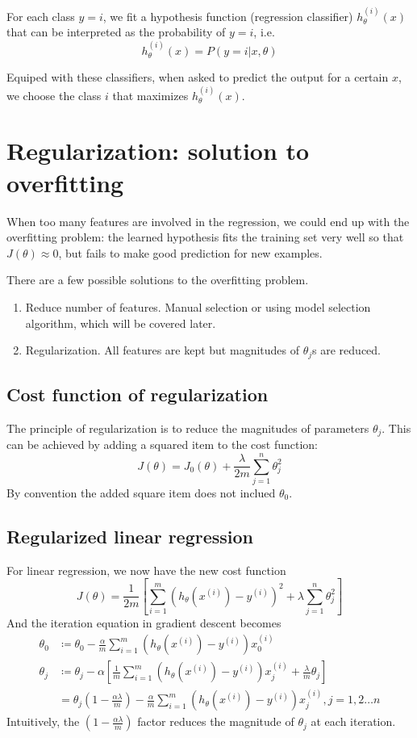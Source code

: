 For each class $y=i$, we fit a hypothesis function (regression classifier) $h_{\theta}^{(i)}(x)$ that can be interpreted as the probability of $y=i$, i.e.
$$h_{\theta}^{(i)}(x) = P(y = i|x,\theta)$$

Equiped with these classifiers, when asked to predict the output for a certain $x$, we choose the class $i$ that maximizes $h_{\theta}^{(i)}(x)$.
\section{Regularization: solution to overfitting}
When too many features are involved in the regression, we could end up with the overfitting problem: the learned hypothesis fits the training set very well so that $J(\theta)\approx0$, but fails to make good prediction for new examples.

There are a few possible solutions to the overfitting problem.
\begin{enumerate}
\item Reduce number of features. Manual selection or using model selection algorithm, which will be covered later.
\item Regularization. All features are kept but magnitudes of $\theta_j$s are reduced. 
\end{enumerate}
\subsection{Cost function of regularization}
The principle of regularization is to reduce the magnitudes of parameters $\theta_j$. This can be achieved by adding a squared item to the cost function:
$$J(\theta) = J_0(\theta) + \frac{\lambda}{2m}\sum\limits_{j=1}^{n}\theta_j^2$$
By convention the added square item does not inclued $\theta_0$.
\subsection{Regularized linear regression}
For linear regression, we now have the new cost function
\begin{equation}
J(\theta) = \frac{1}{2m}\left[\sum\limits_{i=1}^{m}\left(h_{\theta}(x^{(i)}) - y^{(i)}\right)^2 + \lambda\sum\limits_{j=1}^{n}\theta_j^2\right]
\end{equation}
And the iteration equation in gradient descent becomes
\begin{equation}
\begin{split}
\theta_0 &\coloneqq \theta_0 - \frac{\alpha}{m}\sum\limits_{i=1}^{m}\left(h_{\theta}(x^{(i)}) - y^{(i)}\right)
x^{(i)}_0\\
\theta_j &\coloneqq \theta_j - \alpha\left[\frac{1}{m}\sum\limits_{i=1}^{m}\left(h_{\theta}(x^{(i)}) - y^{(i)}\right)
x^{(i)}_j + \frac{\lambda}{m}\theta_j\right]\\
&=\theta_j\left(1-\frac{\alpha\lambda}{m}\right)-\frac{\alpha}{m}\sum\limits_{i=1}^{m}\left(h_{\theta}(x^{(i)}) - y^{(i)}\right)
x^{(i)}_j, j = 1,2 \dots n
\end{split}
\end{equation}
Intuitively, the $\left(1-\frac{\alpha\lambda}{m}\right)$ factor reduces the magnitude of $\theta_j$ at each iteration.

